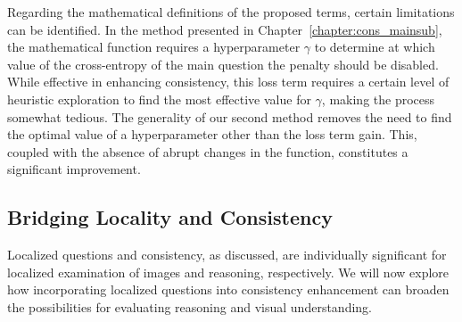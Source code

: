 Regarding the mathematical definitions of the proposed terms, certain limitations can be identified. In the method presented in Chapter~\ref{chapter:cons_mainsub}, the mathematical function requires a hyperparameter $\gamma$ to determine at which value of the cross-entropy of the main question the penalty should be disabled. While effective in enhancing consistency, this loss term requires a certain level of heuristic exploration to find the most effective value for $\gamma$, making the process somewhat tedious. The generality of our second method removes the need to find the optimal value of a hyperparameter other than the loss term gain. This, coupled with the absence of abrupt changes in the function, constitutes a significant improvement. 





\subsection{Bridging Locality and Consistency}
\label{subsec:the_full_picture}


Localized questions and consistency, as discussed, are individually significant for localized examination of images and reasoning, respectively. We will now explore how incorporating localized questions into consistency enhancement can broaden the possibilities for evaluating reasoning and visual understanding.

